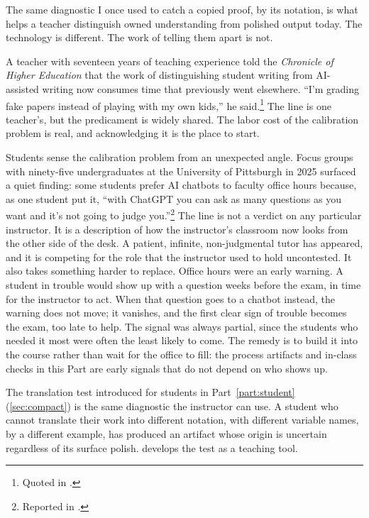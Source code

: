 \documentclass{SIAMbook2023}
\begin{document}
The same diagnostic I once used to catch a copied proof, by its notation, is what helps a teacher distinguish owned understanding from polished output today. The technology is different. The work of telling them apart is not.

A teacher with seventeen years of teaching experience told the \emph{Chronicle of Higher Education} that the work of distinguishing student writing from AI-assisted writing now consumes time that previously went elsewhere. ``I'm grading fake papers instead of playing with my own kids,'' he said.\footnote{Quoted in \citet{mcmurtrie2024professors}.} The line is one teacher's, but the predicament is widely shared. The labor cost of the calibration problem is real, and acknowledging it is the place to start.

Students sense the calibration problem from an unexpected angle. Focus groups with ninety-five undergraduates at the University of Pittsburgh in 2025 surfaced a quiet finding: some students prefer AI chatbots to faculty office hours because, as one student put it, ``with ChatGPT you can ask as many questions as you want and it's not going to judge you.''\footnote{Reported in \citet{silva2025university}.} The line is not a verdict on any particular instructor. It is a description of how the instructor's classroom now looks from the other side of the desk. A patient, infinite, non-judgmental tutor has appeared, and it is competing for the role that the instructor used to hold uncontested. It also takes something harder to replace. Office hours were an early warning. A student in trouble would show up with a question weeks before the exam, in time for the instructor to act. When that question goes to a chatbot instead, the warning does not move; it vanishes, and the first clear sign of trouble becomes the exam, too late to help. The signal was always partial, since the students who needed it most were often the least likely to come. The remedy is to build it into the course rather than wait for the office to fill: the process artifacts and in-class checks in this Part are early signals that do not depend on who shows up.

The translation test introduced for students in Part~\ref{part:student} (\cref{sec:compact}) is the same diagnostic the instructor can use. A student who cannot translate their work into different notation, with different variable names, by a different example, has produced an artifact whose origin is uncertain regardless of its surface polish.  develops the test as a teaching tool.
\end{document}
